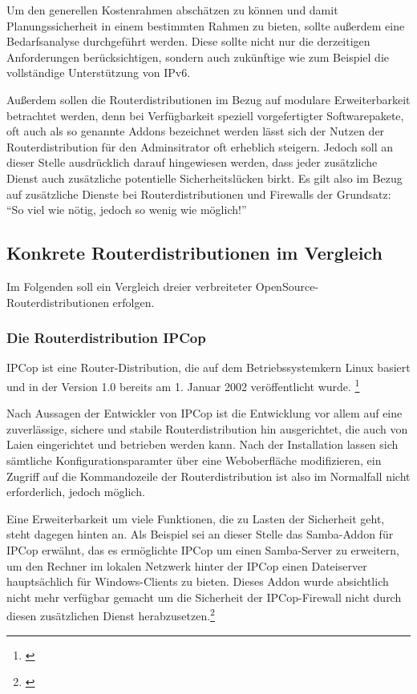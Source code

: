 \documentclass[a4paper,12pt]{scrartcl}
\begin{document}
Um den generellen Kostenrahmen absch\"atzen zu k\"onnen und damit
Planungssicherheit in einem bestimmten Rahmen zu bieten, sollte au\ss{}erdem
eine Bedarfsanalyse durchgef\"uhrt werden. Diese sollte nicht nur die
derzeitigen Anforderungen ber\"ucksichtigen, sondern auch zuk\"unftige wie zum
Beispiel die vollst\"andige Unterst\"utzung von IPv6.

Au\ss{}erdem sollen die Routerdistributionen im Bezug auf modulare
Erweiterbarkeit betrachtet werden, denn bei Verf\"ugbarkeit speziell
vorgefertigter Softwarepakete, oft auch als so genannte Addons bezeichnet
werden l\"asst sich der Nutzen der Routerdistribution f\"ur den Adminsitrator
oft erheblich steigern. Jedoch soll an dieser Stelle ausdr\"ucklich darauf
hingewiesen werden, dass jeder zus\"atzliche Dienst auch zus\"atzliche
potentielle Sicherheitsl\"ucken birkt. Es gilt also im Bezug auf zus\"atzliche
Dienste bei Routerdistributionen und Firewalls der Grundsatz: ``So viel wie
n\"otig, jedoch so wenig wie m\"oglich!''
 
\subsection{Konkrete Routerdistributionen im Vergleich}
Im Folgenden soll ein Vergleich dreier verbreiteter OpenSource-
Routerdistributionen erfolgen. 

\subsubsection{Die Routerdistribution IPCop}
IPCop ist eine Router-Distribution, die auf dem Betriebssystemkern Linux
basiert und in der Version 1.0 bereits am 1. Januar 2002 ver\"offentlicht
wurde. \footnote{\cite{IPCopManual}}

Nach Aussagen der Entwickler von IPCop ist die Entwicklung vor allem auf eine
zuverl\"assige, sichere und stabile Routerdistribution hin ausgerichtet, die
auch von Laien eingerichtet und betrieben werden kann. Nach der Installation
lassen sich s\"amtliche Konfigurationsparamter \"uber eine Weboberfl\"ache
modifizieren, ein Zugriff auf die Kommandozeile der Routerdistribution ist also
im Normalfall nicht erforderlich, jedoch m\"oglich. 

Eine Erweiterbarkeit um viele Funktionen, die zu Lasten der Sicherheit geht,
steht dagegen hinten an. Als Beispiel sei an dieser Stelle das Samba-Addon f\"ur
IPCop erw\"ahnt, das es erm\"oglichte IPCop um einen Samba-Server zu erweitern,
um den Rechner im lokalen Netzwerk hinter der IPCop einen Dateiserver
haupts\"achlich f\"ur Windows-Clients zu bieten. Dieses Addon wurde absichtlich
nicht mehr verf\"ugbar gemacht um die Sicherheit der IPCop-Firewall nicht durch
diesen zus\"atzlichen Dienst herabzusetzen.\footnote{\cite{IPCopSamba}}
\end{document}
